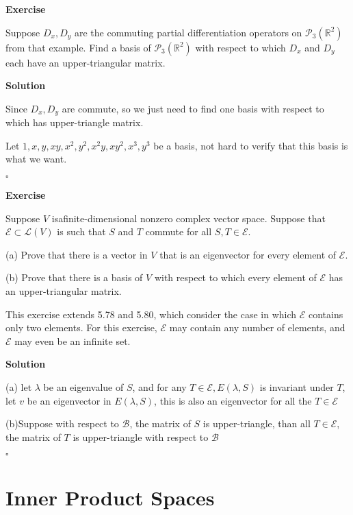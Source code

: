 \documentclass{article}
\newenvironment{exercise}{%
{\textbf{Exercise\\}
    }
}{
}
\newenvironment{solution}{%
{
    \textbf{Solution\\}
    }
}{
  \hfill $\square$ 
  \par\bigskip 
}
\newcommand{\RR}{\mathbb{R}}
\begin{document}
\begin{CJK}{UTF8}{gkai}
\begin{exercise}
    Suppose $D_x,D_y$ are the commuting partial differentiation operators on $\mathcal{P}_3(\RR^2)$ from that example. Find a basis of
    $\mathcal{P}_3(\RR^2)$ with respect to which $D_x$ and $D_y$ each have an upper-triangular matrix.

\end{exercise}

\begin{solution}
    Since $D_x,D_y$ are commute, so we just need to find one basis with respect to which has upper-triangle matrix.

    Let $1,x,y,xy,x^2,y^2,x^2y,xy^2,x^3,y^3$ be a basis, not hard to verify that this basis is what we want.    
\end{solution}

\begin{exercise}
    Suppose $V$ isafinite-dimensional nonzero complex vector space. Suppose that $\mathcal{E} \subset \mathcal{L}(V)$ is such that $S$ and $T$ commute for all $S,T \in \mathcal{E}$.

    (a) Prove that there is a vector in $V$ that is an eigenvector for every element of $\mathcal{E}$.

    (b) Prove that there is a basis of $V$ with respect to which every element of $\mathcal{E}$ has an upper-triangular matrix.

    This exercise extends 5.78 and 5.80, which consider the case in which $\mathcal{E}$ contains only two elements. For this exercise, $\mathcal{E}$ may contain any number of elements, and $\mathcal{E}$ may even be an infinite set.
\end{exercise}

\begin{solution}
    (a) let $\lambda$ be an eigenvalue of $S$, and for any $T \in \mathcal{E}, E(\lambda,S)$ is invariant under $T$, let $v$ be an eigenvector in $E(\lambda,S)$, this is also an eigenvector for all the $T \in \mathcal{E}$

    (b)Suppose with respect to $\mathcal{B}$, the matrix of $S$ is upper-triangle, than all $T \in \mathcal{E}$, the matrix of $T$ is upper-triangle with respect to $\mathcal{B}$ 
\end{solution}


\section{Inner Product Spaces}


\end{CJK}
\end{document}
